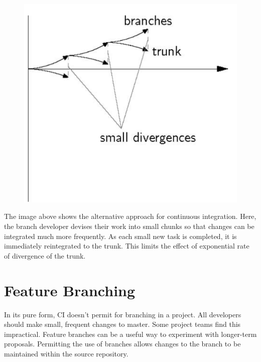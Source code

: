 \documentclass[a4paper, openany]{memoir}
\begin{document}
\begin{figure}[H]
    \centering
    \includegraphics[scale=0.5]{src/9.2 merged integration frequency.PNG}
\end{figure}
\noindent The image above shows the alternative approach for continuous integration. Here, the branch developer devises their work into small chunks so that changes can be integrated much more frequently. As each small new task is completed, it is immediately reintegrated to the trunk. This limits the effect of exponential rate of divergence of the trunk. 

\section{Feature Branching}
In its pure form, CI doesn't permit for branching in a project. All developers should make small, frequent changes to master. Some project teams find this impractical. Feature branches can be a useful way to experiment with longer-term proposals. Permitting the use of branches allows changes to the branch to be maintained within the source repository.
\end{document}
